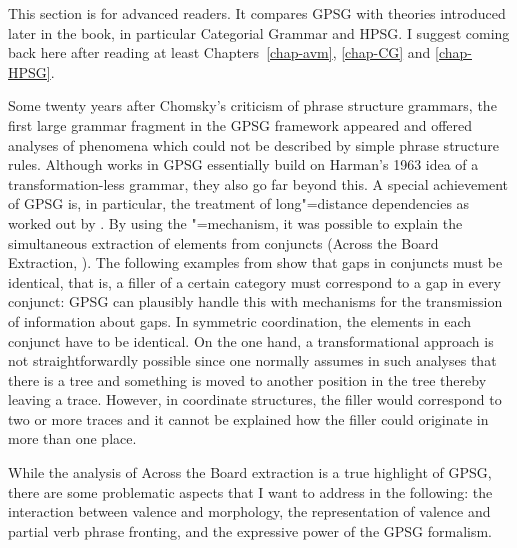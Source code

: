 This section is for advanced readers. It compares GPSG with theories introduced later in the book,
in particular Categorial Grammar and HPSG. I suggest coming back here after reading at least
Chapters~\ref{chap-avm}, \ref{chap-CG} and \ref{chap-HPSG}.

Some
twenty years after Chomsky's criticism of phrase structure grammars, the first large grammar fragment in the GPSG framework appeared and offered analyses of phenomena
which could not be described by simple phrase structure rules. Although works in GPSG essentially build on Harman's 1963 idea of a transformation-less grammar, they also go far
beyond this. A special achievement of GPSG is, in particular, the treatment of long"=distance dependencies as worked out by \citet{Gazdar81a}. By using the \slasch"=mechanism, it
was possible to explain the simultaneous extraction of elements from conjuncts (Across the Board Extraction, \citealp[Section~4.2.4.1]{Ross67a,Williams78a}). The following examples from
\citet[]{Gazdar81a} show that gaps in conjuncts must be identical, that is, a filler of a certain category must correspond to a gap in every conjunct:
\eal\settowidth{}
\label{ex-atb-gazdar}
\zl
GPSG can plausibly handle this with mechanisms for the transmission of information about gaps. In symmetric coordination, the \slasch elements in each conjunct have
to be identical. On the one hand,
a transformational approach is not straightforwardly possible since
one normally assumes in such analyses that there is a tree and something is moved to another
position in the tree thereby leaving a trace. However, in coordinate structures, the filler would
correspond to two or more traces and it cannot be explained how the filler could originate in more
than one place.

While the analysis of Across the Board extraction is a true highlight of GPSG, there are some problematic
aspects that I want to address in the following: the interaction between valence and morphology,
the representation of valence and partial verb phrase fronting, and the expressive power of the GPSG
formalism. 

